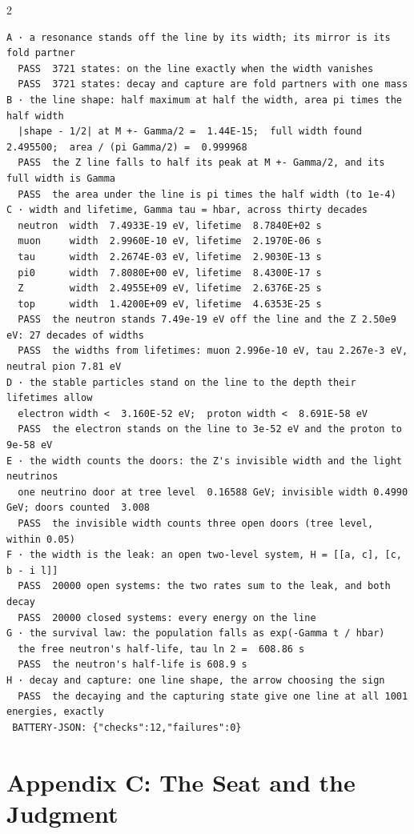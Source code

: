 \documentclass[10pt]{article}
\begin{document}
\begin{multicols}{2}
\begin{Verbatim}[fontsize=\fontsize{5.9}{6.8}\selectfont,breaklines,breakanywhere,breaksymbolleft={}]
A · a resonance stands off the line by its width; its mirror is its fold partner
  PASS  3721 states: on the line exactly when the width vanishes
  PASS  3721 states: decay and capture are fold partners with one mass
B · the line shape: half maximum at half the width, area pi times the half width
  |shape - 1/2| at M +- Gamma/2 =  1.44E-15;  full width found   2.495500;  area / (pi Gamma/2) =  0.999968
  PASS  the Z line falls to half its peak at M +- Gamma/2, and its full width is Gamma
  PASS  the area under the line is pi times the half width (to 1e-4)
C · width and lifetime, Gamma tau = hbar, across thirty decades
  neutron  width  7.4933E-19 eV, lifetime  8.7840E+02 s
  muon     width  2.9960E-10 eV, lifetime  2.1970E-06 s
  tau      width  2.2674E-03 eV, lifetime  2.9030E-13 s
  pi0      width  7.8080E+00 eV, lifetime  8.4300E-17 s
  Z        width  2.4955E+09 eV, lifetime  2.6376E-25 s
  top      width  1.4200E+09 eV, lifetime  4.6353E-25 s
  PASS  the neutron stands 7.49e-19 eV off the line and the Z 2.50e9 eV: 27 decades of widths
  PASS  the widths from lifetimes: muon 2.996e-10 eV, tau 2.267e-3 eV, neutral pion 7.81 eV
D · the stable particles stand on the line to the depth their lifetimes allow
  electron width <  3.160E-52 eV;  proton width <  8.691E-58 eV
  PASS  the electron stands on the line to 3e-52 eV and the proton to 9e-58 eV
E · the width counts the doors: the Z's invisible width and the light neutrinos
  one neutrino door at tree level  0.16588 GeV; invisible width 0.4990 GeV; doors counted  3.008
  PASS  the invisible width counts three open doors (tree level, within 0.05)
F · the width is the leak: an open two-level system, H = [[a, c], [c, b - i l]]
  PASS  20000 open systems: the two rates sum to the leak, and both decay
  PASS  20000 closed systems: every energy on the line
G · the survival law: the population falls as exp(-Gamma t / hbar)
  the free neutron's half-life, tau ln 2 =  608.86 s
  PASS  the neutron's half-life is 608.9 s
H · decay and capture: one line shape, the arrow choosing the sign
  PASS  the decaying and the capturing state give one line at all 1001 energies, exactly
 BATTERY-JSON: {"checks":12,"failures":0}
\end{Verbatim}
\end{multicols}

\hypertarget{appendix-c-the-seat-and-the-judgment}{%
\section{Appendix C: The Seat and the
Judgment}\label{appendix-c-the-seat-and-the-judgment}}
\end{document}

